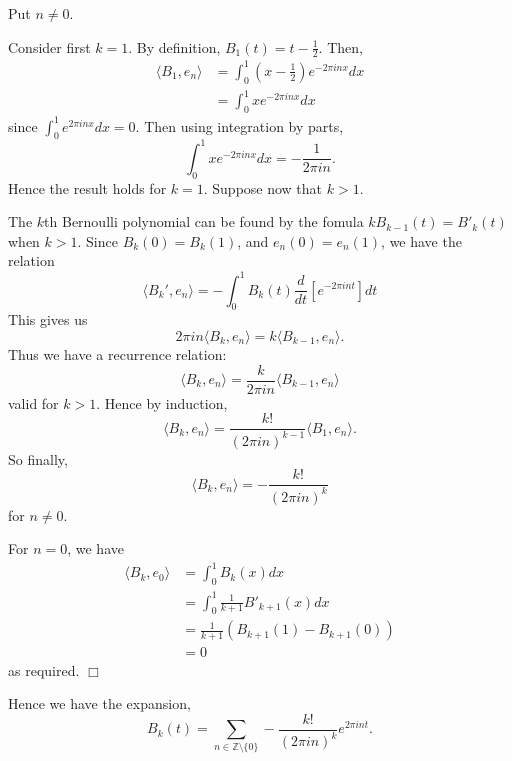 \documentclass[10pt]{article}
\newenvironment{proof}[1][Proof]{\begin{trivlist}
\item[\hskip \labelsep {\bfseries #1}]}{\end{trivlist}}
\begin{document}
    \begin{proof}
        Put $n\neq 0$.
    
        Consider first $k = 1$. By definition,
        $B_1(t) = t-\frac{1}{2}$. Then,
        \begin{align*}
            \langle B_1,e_n \rangle &= \int_{0}^1\! (x-\frac{1}{2})e^{-2\pi inx}dx\\
            &= \int_0^1\!xe^{-2\pi i nx}dx
        \end{align*}
        since $\int_0^1e^{2\pi inx}dx = 0$. Then using integration by parts,
        \begin{equation*}
            \int_{0}^1\!xe^{-2\pi inx}dx = -\frac{1}{2\pi i n}.
        \end{equation*}
        Hence the result holds for $k = 1$. Suppose now that $k > 1$.
        
        The $k$th Bernoulli polynomial can be found by the fomula $kB_{k-1}(t) = B'_k(t)$
        when $k > 1$.
        Since $B_k(0) = B_k(1)$, and $e_n(0) = e_n(1)$, we have the relation
        \begin{equation*}
            \langle B_k',e_n\rangle = -\int_{0}^1 B_k(t)\frac{d}{dt}[e^{-2\pi i n t}]dt
        \end{equation*}
        This gives us
        \begin{equation*}
            2\pi i n\langle B_k,e_n\rangle = k\langle B_{k-1},e_n\rangle.
        \end{equation*}
        Thus we have a recurrence relation:
        \begin{equation*}
            \langle B_k,e_n\rangle = \frac{k}{2\pi i n}\langle B_{k-1},e_n\rangle
        \end{equation*}
        valid for $k > 1$. Hence by induction,
        \begin{equation*}
            \langle B_k,e_n\rangle = \frac{k!}{(2\pi in)^{k-1}}\langle B_1,e_n\rangle.
        \end{equation*}
        So finally,
        \begin{equation*}
            \langle B_k,e_n \rangle = -\frac{k!}{(2\pi in)^k}
        \end{equation*}
        for $n\neq 0$.
        
        For $n = 0$, we have
        \begin{align*}
            \langle B_k,e_0\rangle &= \int_0^1\!B_k(x)dx\\
            &= \int_0^1\frac{1}{k+1}B'_{k+1}(x)dx\\
            &= \frac{1}{k+1}(B_{k+1}(1)-B_{k+1}(0))\\
            &= 0
        \end{align*} 
        as required.
        $\Box$
    \end{proof} 
    Hence we have the expansion,
    \begin{equation*}
        B_k(t) = \sum_{n\in \mathbb{Z}\setminus\{0\}} -\frac{k!}{(2\pi i n)^k}e^{2\pi i nt}.
    \end{equation*}
    
\end{document}
